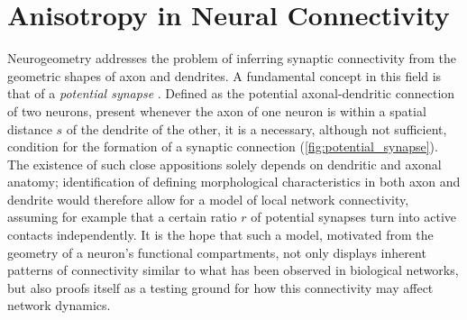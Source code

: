 


\section{Anisotropy in Neural Connectivity}
\label{sec:biol_anisotropy}

Neurogeometry addresses the problem of inferring
synaptic connectivity from the geometric shapes of axon and
dendrites. A fundamental concept in this field is that of a
\textit{potential synapse}
\parencite{Stepanyants2002}. Defined as the potential axonal-dendritic
connection of two neurons, present whenever the axon of one neuron is
within a spatial distance $s$ of the dendrite of the other, it is a
necessary, although not sufficient, condition for the formation of a
synaptic connection (\autoref{fig:potential_synapse}). The existence
of such close appositions solely depends on dendritic and axonal
anatomy; identification of defining morphological characteristics in
both axon and dendrite would therefore allow for a model of local
network connectivity, assuming for example that a certain ratio $r$ of
potential synapses turn into active contacts independently. It is the
hope that such a model, motivated from the geometry of a neuron's
functional compartments, not only displays inherent patterns of
connectivity similar to what has been observed in biological networks,
but also proofs itself as a testing ground for how this connectivity
may affect network dynamics.

